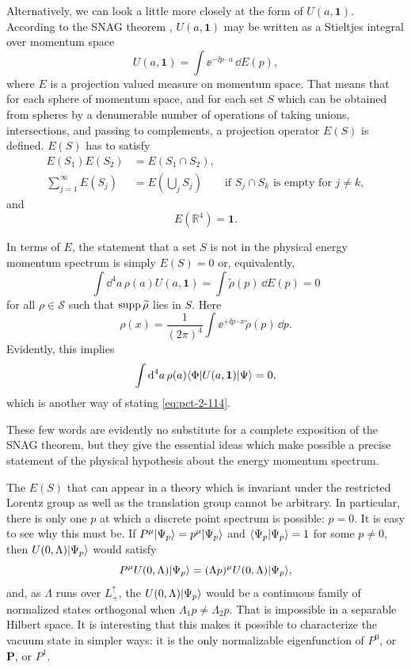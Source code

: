 Alternatively, we can look a little more closely at the form of
$U(a,\mathbf{1})$. According to the SNAG theorem \cite{pct-22},
$U(a,\mathbf{1})$ may be written as a Stieltjes integral over momentum space
\begin{equation*}
  U(a,\mathbf{1})=\int\ee^{-\ii p\cdot a}\,\dd E(p),
\end{equation*}
where $E$ is a projection valued measure on momentum space.  That means that
for each sphere of momentum space, and for each set $S$ which can be obtained
from spheres by a denumerable number of operations of taking unions,
intersections, and passing to complements, a projection operator $E(S)$ is
defined.  $E(S)$ has to satisfy
\begin{align*}
  E(S_1)E(S_2)&=E(S_1\cap S_2),\\
  \sum_{j=1}^{\infty}E(S_j)&=E\left(\bigcup_j S_j\right)
  \qquad\text{if }S_j\cap S_k\text{ is empty for }j\ne k,
\end{align*}
and
\begin{equation*}
  E(\mathbb{R}^4)=\mathbf{1}.
\end{equation*}

In terms of $E$, the statement that a set $S$ is not in the physical energy
momentum spectrum is simply $E(S)=0$ or, equivalently,
\begin{equation*}
  \int\dd^4a\,\rho(a)U(a,\mathbf{1})
  =\int\widetilde{\rho}(p)\,\dd E(p)=0
\end{equation*}
for all $\rho\in\mathcal{S}$ such that $\operatorname{supp}\widetilde{\rho}$ lies in $S$.
Here
\begin{equation*}
  \rho(x)=\frac{1}{(2\pi)^4}\int\ee^{+\ii p\cdot x}
  \widetilde{\rho}(p)\,\dd p.
\end{equation*}
Evidently, this implies
\begin{equation*}
  \int\mathop{}\!\mathrm{d}^4a\,\rho(a)\langle \Phi\vert U(a,\mathbf{1})\vert \Psi\rangle=0,
\end{equation*}
which is another way of stating \eqref{eq:pct-2-114}.

These few words are evidently no substitute for a complete exposition of the
SNAG theorem, but they give the essential ideas which make possible a precise
statement of the physical hypothesis about the energy momentum spectrum.

The $E(S)$ that can appear in a theory which is invariant under the
restricted Lorentz group as well as the translation group cannot be arbitrary.
In particular, there is only one $p$ at which a discrete point spectrum is
possible: $p=0$.  It is easy to see why this must be.  If
$P^\mu\lvert \Psi_p\rangle=p^\mu\lvert \Psi_p\rangle$ and
$\langle \Psi_p\vert \Psi_p\rangle=1$ for some $p\ne0$, then
$U(0,\Lambda)\lvert \Psi_p\rangle$ would satisfy
\begin{equation*}
  P^\mu U(0,\Lambda)\lvert \Psi_p\rangle
  =(\Lambda p)^\mu U(0,\Lambda)\lvert \Psi_p\rangle,
\end{equation*}
and, as $\Lambda$ runs over $L_+^\uparrow$, the
$U(0,\Lambda)\lvert \Psi_p\rangle$ would be a continuous family of normalized states
orthogonal when $\Lambda_1p\ne\Lambda_2p$.  That is impossible in a separable
Hilbert space.  It is interesting that this makes it possible to characterize
the vacuum state in simpler ways: it is the only normalizable eigenfunction of
$P^0$, or $\mathbf{P}$, or $P^1$.
